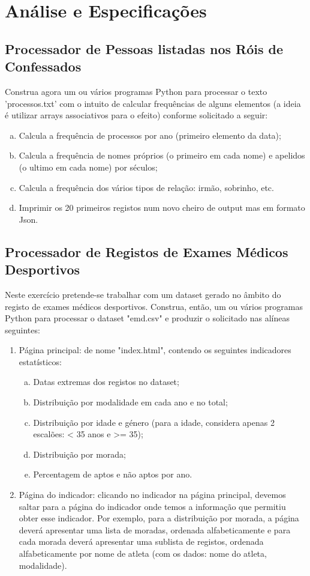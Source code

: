 \documentclass[11pt,a4paper]{report}%
\begin{document}
\newpage



\chapter{Análise e Especificações}

\section{Processador de Pessoas listadas nos Róis de Confessados}
Construa agora um ou vários programas Python para processar o texto 'processos.txt' com o intuito de calcular frequências de alguns elementos (a ideia é utilizar arrays associativos para o efeito) conforme solicitado a seguir:
\begin{enumerate}[a)]
	\item Calcula a frequência de processos por ano (primeiro elemento da data);
	\item Calcula a frequência de nomes próprios (o primeiro em cada nome) e apelidos (o ultimo em cada nome) por séculos;
	\item Calcula a frequência dos vários tipos de relação: irmão, sobrinho, etc.
	\item Imprimir os 20 primeiros registos num novo cheiro de output mas em formato Json.
\end{enumerate}


\section{Processador de Registos de Exames Médicos Desportivos}
Neste exercício pretende-se trabalhar com um dataset gerado no âmbito do registo de exames médicos desportivos.
Construa, então, um ou vários programas Python para processar o dataset "emd.csv" e produzir o solicitado nas alíneas seguintes:
\begin{enumerate}[1.]
	\item Página principal: de nome "index.html", contendo os seguintes indicadores estatísticos:
	\begin{enumerate}[a)]
		\item Datas extremas dos registos no dataset;
		\item Distribuição por modalidade em cada ano e no total;
		\item Distribuição por idade e género (para a idade, considera apenas 2 escalões: < 35 anos e >= 35);
		\item Distribuição por morada;
		\item Percentagem de aptos e não aptos por ano.
	\end{enumerate}
	\item Página do indicador: clicando no indicador na página principal, devemos saltar para a página do indicador
	onde temos a informação que permitiu obter esse indicador. Por exemplo, para a distribuição por morada,
	a página deverá apresentar uma lista de moradas, ordenada alfabeticamente e para cada morada deverá
	apresentar uma sublista de registos, ordenada alfabeticamente por nome de atleta (com os dados: nome do
	atleta, modalidade).
\end{enumerate}
\end{document}
